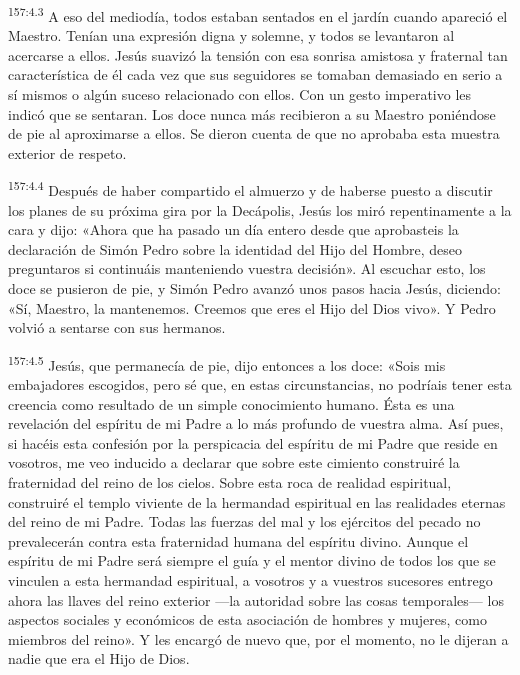 \par 
\textsuperscript{157:4.3} A eso del mediodía, todos estaban sentados en el jardín cuando apareció el Maestro. Tenían una expresión digna y solemne, y todos se levantaron al acercarse a ellos. Jesús suavizó la tensión con esa sonrisa amistosa y fraternal tan característica de él cada vez que sus seguidores se tomaban demasiado en serio a sí mismos o algún suceso relacionado con ellos. Con un gesto imperativo les indicó que se sentaran. Los doce nunca más recibieron a su Maestro poniéndose de pie al aproximarse a ellos. Se dieron cuenta de que no aprobaba esta muestra exterior de respeto.

\par 
\textsuperscript{157:4.4} Después de haber compartido el almuerzo y de haberse puesto a discutir los planes de su próxima gira por la Decápolis, Jesús los miró repentinamente a la cara y dijo: «Ahora que ha pasado un día entero desde que aprobasteis la declaración de Simón Pedro sobre la identidad del Hijo del Hombre, deseo preguntaros si continuáis manteniendo vuestra decisión». Al escuchar esto, los doce se pusieron de pie, y Simón Pedro avanzó unos pasos hacia Jesús, diciendo: «Sí, Maestro, la mantenemos. Creemos que eres el Hijo del Dios vivo». Y Pedro volvió a sentarse con sus hermanos.

\par 
\textsuperscript{157:4.5} Jesús, que permanecía de pie, dijo entonces a los doce: «Sois mis embajadores escogidos, pero sé que, en estas circunstancias, no podríais tener esta creencia como resultado de un simple conocimiento humano. Ésta es una revelación del espíritu de mi Padre a lo más profundo de vuestra alma. Así pues, si hacéis esta confesión por la perspicacia del espíritu de mi Padre que reside en vosotros, me veo inducido a declarar que sobre este cimiento construiré la fraternidad del reino de los cielos. Sobre esta roca de realidad espiritual, construiré el templo viviente de la hermandad espiritual en las realidades eternas del reino de mi Padre. Todas las fuerzas del mal y los ejércitos del pecado no prevalecerán contra esta fraternidad humana del espíritu divino. Aunque el espíritu de mi Padre será siempre el guía y el mentor divino de todos los que se vinculen a esta hermandad espiritual, a vosotros y a vuestros sucesores entrego ahora las llaves del reino exterior ---la autoridad sobre las cosas temporales--- los aspectos sociales y económicos de esta asociación de hombres y mujeres, como miembros del reino». Y les encargó de nuevo que, por el momento, no le dijeran a nadie que era el Hijo de Dios.


